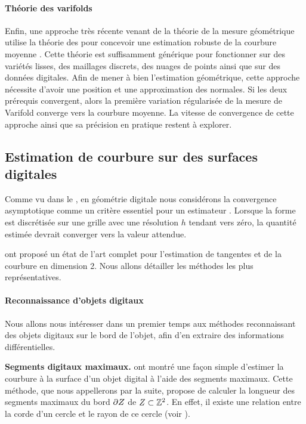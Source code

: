 \paragraph{Théorie des varifolds}
%
Enfin, une approche très récente venant de la théorie de la mesure géométrique
utilise la théorie des  \cite{Almgren1965} pour concevoir une
estimation robuste de la courbure moyenne \cite{Buet2014,Buet2015}. Cette
théorie est suffisamment générique pour fonctionner sur des variétés lisses, des
maillages discrets, des nuages de points ainsi que sur des données digitales.
Afin de mener à bien l'estimation géométrique, cette approche nécessite d'avoir
une position et une approximation des normales. Si les deux prérequis
convergent, alors la première variation régularisée de la mesure de Varifold
converge vers la courbure moyenne. La vitesse de convergence de cette approche
ainsi que sa précision en pratique restent à explorer.
%
\subsection{Estimation de courbure sur des surfaces digitales}
%
Comme vu dans le , en géométrie digitale nous
considérons la convergence asymptotique comme un critère essentiel pour un
estimateur \cite{Klette2000}. Lorsque la forme est discrétisée
sur une grille avec une résolution $h$ tendant vers zéro, la quantité estimée
devrait converger vers la valeur attendue.


 ont proposé un état de l'art
complet pour l'estimation de tangentes et de la courbure en dimension 2. Nous
allons détailler les méthodes les plus représentatives.
%
\paragraph{Reconnaissance d'objets digitaux}
%
Nous allons nous intéresser dans un premier temps aux méthodes reconnaissant des
objets digitaux sur le bord de l'objet, afin d'en extraire des informations
différentielles.


\noindent\textbf{Segments digitaux maximaux.\quad}
 ont montré une façon simple d'estimer
la courbure à la surface d'un objet digital à l'aide des segments maximaux.
Cette méthode, que nous appellerons \MDSS par la suite, propose de calculer la
longueur des segments maximaux du bord $\partial Z$ de $Z
\subset \mathbb{Z}^2$. En effet, il existe une relation entre la corde d'un cercle et
le rayon de ce cercle (voir ).

